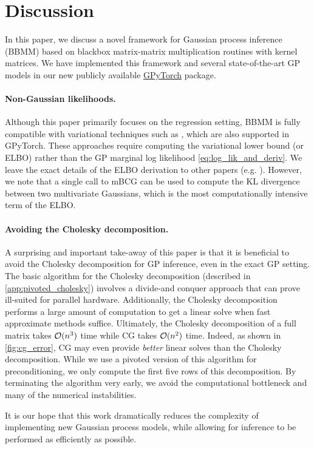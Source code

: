 \section{Discussion}
In this paper, we discuss a novel framework for Gaussian process inference (BBMM) based on blackbox matrix-matrix multiplication routines with kernel matrices.
We have implemented this framework and several state-of-the-art GP models in our new publicly available {\href{https://gpytorch.ai}{GPyTorch}} package.

\paragraph{Non-Gaussian likelihoods.}
Although this paper primarily focuses on the regression setting, BBMM is fully compatible with variational techniques such as \cite{hensman2015scalable,wilson2016stochastic}, which are also supported in GPyTorch.
These approaches require computing the variational lower bound (or ELBO) rather than the GP marginal log likelihood \eqref{eq:log_lik_and_deriv}. We leave the exact details of the ELBO derivation to other papers (e.g. \cite{hensman2015scalable}).
However, we note that a single call to mBCG can be used to compute the KL divergence between two multivariate Gaussians, which is the most computationally intensive term of the ELBO.

\paragraph{Avoiding the Cholesky decomposition.}
A surprising and important take-away of this paper is that it is beneficial to avoid the Cholesky decomposition for GP inference, even in the exact GP setting.
The basic algorithm for the Cholesky decomposition (described in \autoref{app:pivoted_cholesky}) involves a divide-and conquer approach that can prove ill-suited for parallel hardware.
Additionally, the Cholesky decomposition performs a large amount of computation to get a linear solve when fast approximate methods suffice.
Ultimately, the Cholesky decomposition of a full matrix takes $\bigo{n^3}$ time while CG takes $\bigo{n^2}$ time.
Indeed, as shown in \autoref{fig:cg_error}, CG may even provide \emph{better} linear solves than the Cholesky decomposition.
While we use a pivoted version of this algorithm for preconditioning, we only compute the first five rows of this decomposition.
By terminating the algorithm very early, we avoid the computational bottleneck and many of the numerical instabilities.

It is our hope that this work dramatically reduces the complexity of implementing new Gaussian process models,
while allowing for inference to be performed as efficiently as possible.
